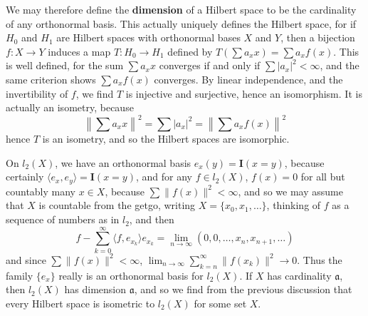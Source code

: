 We may therefore define the {\bf dimension} of a Hilbert space to be the cardinality of any orthonormal basis. This actually uniquely defines the Hilbert space, for if $H_0$ and $H_1$ are Hilbert spaces with orthonormal bases $X$ and $Y$, then a bijection $f: X \to Y$ induces a map $T: H_0 \to H_1$ defined by $T \left( \sum a_x x \right) = \sum a_x f(x)$. This is well defined, for the sum $\sum a_x x$ converges if and only if $\sum |a_x|^2 < \infty$, and the same criterion shows $\sum a_x f(x)$ converges. By linear independence, and the invertibility of $f$, we find $T$ is injective and surjective, hence an isomorphism. It is actually an isometry, because
%
\[ \left\| \sum a_x x \right\|^2 = \sum |a_x|^2 = \left\| \sum a_x f(x) \right\|^2 \]
%
hence $T$ is an isometry, and so the Hilbert spaces are isomorphic.

\begin{example}
    On $l_2(X)$, we have an orthonormal basis $e_x(y) = \mathbf{I}(x = y)$, because certainly $\langle e_x, e_y \rangle = \mathbf{I}(x = y)$, and for any $f \in l_2(X)$, $f(x) = 0$ for all but countably many $x \in X$, because $\sum \| f(x) \|^2 < \infty$, and so we may assume that $X$ is countable from the getgo, writing $X = \{ x_0, x_1, \dots \}$, thinking of $f$ as a sequence of numbers as in $l_2$, and then
    \[ f - \sum_{k = 0}^\infty \langle f, e_{x_k} \rangle e_{x_k} = \lim_{n \to \infty} (0,0,\dots,x_n, x_{n+1}, \dots) \]
    and since $\sum \| f(x) \|^2 < \infty$, $\lim_{n \to \infty} \sum_{k = n}^\infty \| f(x_k) \|^2 \to 0$. Thus the family $\{ e_x \}$ really is an orthonormal basis for $l_2(X)$. If $X$ has cardinality $\mathfrak{a}$, then $l_2(X)$ has dimension $\mathfrak{a}$, and so we find from the previous discussion that every Hilbert space is isometric to $l_2(X)$ for some set $X$.
\end{example}

